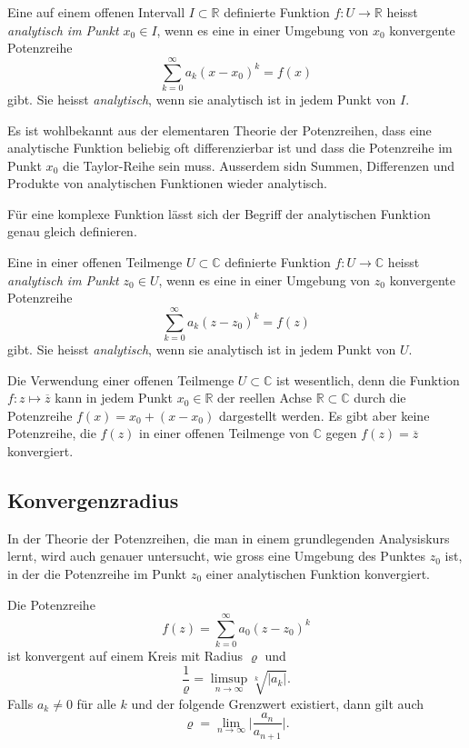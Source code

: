 %
%
\begin{definition}
Eine auf einem offenen Intervall $I\subset \mathbb {R}$ definierte Funktion
$f\colon U\to\mathbb{R}$ heisst {\em analytisch im Punkt  $x_0\in I$}, wenn
es eine in einer Umgebung von $x_0$ konvergente Potenzreihe
\[
\sum_{k=0}^\infty a_k(x-x_0)^k = f(x)
\]
gibt.
Sie heisst {\em analytisch}, wenn sie analytisch ist in jedem Punkt von $I$.
\end{definition}

Es ist wohlbekannt aus der elementaren Theorie der Potenzreihen, dass
eine analytische Funktion beliebig oft differenzierbar ist und dass
die Potenzreihe im Punkt $x_0$ die Taylor-Reihe sein muss.
Ausserdem sidn Summen, Differenzen und Produkte von analytischen Funktionen
wieder analytisch.

Für eine komplexe Funktion lässt sich der Begriff der
analytischen Funktion genau gleich definieren.

\begin{definition}
Eine in einer offenen Teilmenge $U\subset \mathbb{C}$ definierte Funktion
$f\colon U\to\mathbb{C}$ heisst {\em analytisch im Punkt $z_0\in U$}, wenn
es eine in einer Umgebung von $z_0$ konvergente Potenzreihe
\[
\sum_{k=0}^\infty a_k(z-z_0)^k = f(z)
\]
gibt.
Sie heisst {\em analytisch}, wenn sie analytisch ist in jedem Punkt von $U$.
\end{definition}

Die Verwendung einer offenen Teilmenge $U\subset\mathbb{C}$ ist wesentlich,
denn die Funktion $f\colon z\mapsto \overline{z}$ kann in jedem Punkt
$x_0\in\mathbb{R}$
der reellen Achse $\mathbb{R}\subset\mathbb{C}$ durch die Potenzreihe 
$f(x) = x_0 + (x-x_0)$ dargestellt werden.
Es gibt aber keine Potenzreihe, die $f(z)$ in einer offenen Teilmenge
von $\mathbb{C}$ gegen $f(z)=\overline{z}$ konvergiert.

%
%
\subsection{Konvergenzradius
\label{buch:funktionentheorie:subsection:konvergenzradius}}
In der Theorie der Potenzreihen, die man in einem grundlegenden
Analysiskurs lernt, wird auch genauer untersucht, wie gross
eine Umgebung des Punktes $z_0$ ist, in der die Potenzreihe
im Punkt $z_0$ einer analytischen Funktion konvergiert.

\begin{satz}
\label{buch:funktionentheorie:satz:konvergenzradius}
Die Potenzreihe
\[
f(z) = \sum_{k=0}^\infty a_0(z-z_0)^k
\]
ist konvergent auf einem Kreis mit Radius $\varrho$ und
\[
\frac{1}{\varrho}
=
\limsup_{n\to\infty} \sqrt[k]{|a_k|}.
\]
Falls $a_k\ne 0$ für alle $k$ und der folgende Grenzwert existiert,
dann gilt auch
\[
\varrho = \lim_{n\to\infty} \biggl| \frac{a_n}{a_{n+1}}\biggr|.
\]
\end{satz}

